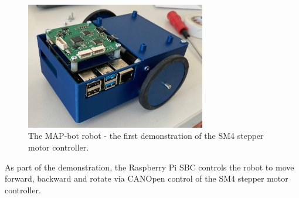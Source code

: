 \begin{figure}[H]
    \centering
    \includegraphics[width=0.7\textwidth]{obrazky/map_bot}
    \caption{The MAP-bot robot - the first demonstration of the SM4 stepper motor controller.}
    \label{fig:map_bot}
\end{figure}

As part of the demonstration, the Raspberry Pi SBC controls the robot to move forward, backward and rotate via CANOpen control of the SM4 stepper motor controller.
